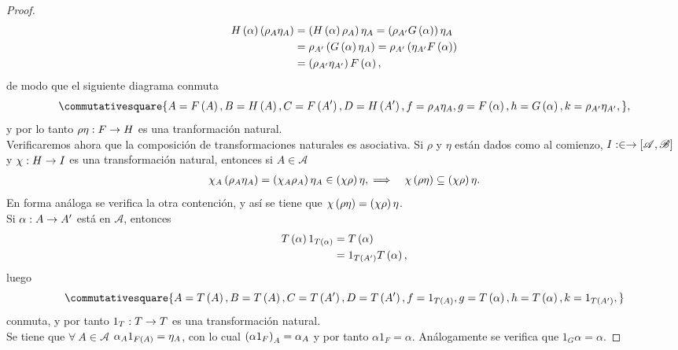 \documentclass{article}
\begin{document}
\begin{enumerate}[label=\textbf{Ej \arabic*.}]
\begin{proof}
	 	\begin{align*}
	 		H\left(\alpha\right)\left(\rho_A\eta_A\right)&=\left(H\left(\alpha\right)\rho_{A}\right)\eta_{A}=\left(\rho_{A'}G\left(\alpha\right)\right)\eta_{A}\\&=\rho_{A'}\left(G\left(\alpha\right)\eta_{A}\right)=\rho_{A'}\left(\eta_{A'}F\left(\alpha\right)\right)\\&=\left(\rho_{A'}\eta_{A'}\right)F\left(\alpha\right),
	 	\end{align*}
 		de modo que el siguiente diagrama conmuta
 		\begin{equation*}
 			\commutativesquare{A=F\lrprth{A},B=H\lrprth{A},C=F\lrprth{A'},D=H\lrprth{A'},f=\rho_{A}\eta_{A},g=F\lrprth{\alpha},h=G\lrprth{\alpha},k=\rho_{A'}\eta_{A'},},
 		\end{equation*}
 		y por lo tanto $\rho\eta:F\to H$ es una tranformación natural.\\
 		Verificaremos ahora que la composición de transformaciones naturales es asociativa. Si $\rho$ y $\eta$ están dados como al comienzo, $I:\in\to \left[\mathscr{A},\mathscr{B}\right]$ y $\chi:H\to I$  es una transformación natural, entonces si $A\in\mathscr{A}$
 		\begin{align*}
 			\chi_A\left(\rho_{A}\eta_{A}\right)&=\left(\chi_A\rho_{A}\right)\eta_{A}\in\left(\chi\rho\right)\eta,
 			\implies & \chi\left(\rho\eta\right)\subseteq\left(\chi\rho\right)\eta.
 		\end{align*}
 		En forma análoga se verifica la otra contención, y así se tiene que $\chi\left(\rho\eta\right)=\left(\chi\rho\right)\eta$.\\
 		 Si $\alpha:A\to A'$ está en $\mathscr{A}$, entonces
 		\begin{align*}
 			T\left(\alpha\right)1_{T\left(\alpha\right)}&=T\left(\alpha\right)\\
 			&=1_{T\left(A'\right)}T\left(\alpha\right),
		\end{align*}
		luego\begin{equation*}
			\commutativesquare{A=T\lrprth{A},B=T\lrprth{A},C=T\lrprth{A'},D=T\lrprth{A'},f=1_{T\lrprth{A}},g=T\lrprth{\alpha},h=T\lrprth{\alpha},k=1_{T\lrprth{A'}},}
		\end{equation*}
		conmuta, y por tanto $1_T:T\to T$ es una transformación natural.\\
		 Se tiene que $\forall\ A\in\mathscr{A}$ $\alpha_A1_{F\left(A\right)}=\eta_A$, con lo cual $\left(\alpha 1_F\right)_A=\alpha_A$ y por tanto $\alpha 1_F=\alpha$. Análogamente se verifica que $1_G\alpha=\alpha$.
		\end{proof}

\end{enumerate}
\end{document}
